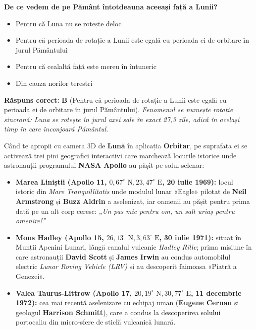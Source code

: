 \vspace{6pt}
\begin{tcolorbox}[orbitarquiz, title={\textbf{Întrebare de verificare \#5: Luna}}]
\textbf{De ce vedem de pe Pământ întotdeauna aceeași față a Lunii?}
\begin{itemize}[leftmargin=2.2em, itemsep=2pt, topsep=4pt]
  \item[$\square$ \textbf{A.}] Pentru că Luna nu se rotește deloc
  \item[$\square$ \textbf{B.}] Pentru că perioada de rotație a Lunii este egală cu perioada ei de orbitare în jurul Pământului
  \item[$\square$ \textbf{C.}] Pentru că cealaltă față este mereu în întuneric
  \item[$\square$ \textbf{D.}] Din cauza norilor terestri
\end{itemize}
\vspace{2pt}
{\footnotesize\color{orbitarMuted}\textbf{Răspuns corect:} \textbf{B} (Pentru că perioada de rotație a Lunii este egală cu perioada ei de orbitare în jurul Pământului). \emph{Fenomenul se numește rotație sincronă: Luna se rotește în jurul axei sale în exact 27,3 zile, adică în același timp în care înconjoară Pământul.}}
\end{tcolorbox}
\vspace{6pt}

\begin{tcolorbox}[orbitarcadet, title={\textbf{Repere Istorice pe Globul Lunii în Orbitar (\texttt{SurfaceMarkers.ts})}}]
Când te apropii cu camera 3D de \textbf{Lună} în aplicația \textbf{Orbitar}, pe suprafața ei se activează trei pini geografici interactivi care marchează locurile istorice unde astronauții programului \textbf{NASA Apollo} au pășit pe solul selenar:
\begin{itemize}[leftmargin=1.4em, itemsep=3pt]
  \item \textbf{Marea Liniștii (Apollo 11, $0{,}67^\circ\text{ N}, 23{,}47^\circ\text{ E}$, 20 iulie 1969):} locul istoric din \emph{Mare Tranquillitatis} unde modulul lunar «Eagle» pilotat de \textbf{Neil Armstrong} și \textbf{Buzz Aldrin} a aselenizat, iar oamenii au pășit pentru prima dată pe un alt corp ceresc: \emph{„Un pas mic pentru om, un salt uriaș pentru omenire!”}
  \item \textbf{Mons Hadley (Apollo 15, $26{,}13^\circ\text{ N}, 3{,}63^\circ\text{ E}$, 30 iulie 1971):} situat în Munții Apenini Lunari, lângă canalul vulcanic \emph{Hadley Rille}; prima misiune în care astronauții \textbf{David Scott} și \textbf{James Irwin} au condus automobilul electric \emph{Lunar Roving Vehicle (LRV)} și au descoperit faimoasa «Piatră a Genezei».
  \item \textbf{Valea Taurus-Littrow (Apollo 17, $20{,}19^\circ\text{ N}, 30{,}77^\circ\text{ E}$, 11 decembrie 1972):} cea mai recentă aselenizare cu echipaj uman (\textbf{Eugene Cernan} și geologul \textbf{Harrison Schmitt}), care a condus la descoperirea solului portocaliu din micro-sfere de sticlă vulcanică lunară.
\end{itemize}
\end{tcolorbox}

